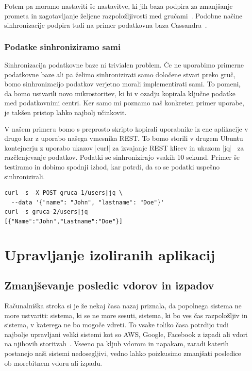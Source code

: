 \documentclass[a4paper, 12pt]{book}
\begin{document}
Potem pa moramo nastaviti še nastavitve, ki jih baza podpira za zmanj\-šan\-je prometa in zagotavljanje željene razpoložljivosti med gručami~\cite{cratedb-zone}.
Podobne načine sinhronizacije podpira tudi na primer podatkovna baza Cassandra~\cite{cassandra-zone}.
\subsection{Podatke sinhroniziramo sami}
Sinhronizacija podatkovne baze ni trivialen problem.
Če ne uporabimo primerne podatkovne baze ali pa želimo sinhronizirati samo določene stvari preko gruč, bomo sinhronizacijo podatkov verjetno morali implementirati sami.
To pomeni, da bomo ustvarili novo mikrostoritev, ki bi v ozadju kopirala ključne podatke med podatkovnimi centri.
Ker samo mi poznamo naš konkreten primer uporabe, je takšen pristop lahko najbolj učinkovit.

V našem primeru bomo s preprosto skripto kopirali uporabnike iz ene aplikacije v drugo kar z uporabo našega vmesnika REST.
To bomo storili v drugem Ubuntu kontejnerju z uporabo ukazov \spverb|curl| za izvajanje REST klicev in ukazom \spverb|jq|~\cite{jq} za razčlenjevanje podatkov.
Podatki se sinhronizirajo vsakih 10 sekund.
Primer še testiramo in dobimo spodnji izhod, kar potrdi, da so se podatki uspešno sinhronizirali.
\begin{verbatim}
curl -s -X POST gruca-1/users|jq \
  --data '{"name": "John", "lastname": "Doe"}'
curl -s gruca-2/users|jq
[{"Name":"John","Lastname":"Doe"}]
\end{verbatim}
\chapter{Upravljanje izoliranih aplikacij}
\section{Zmanjševanje posledic vdorov in izpadov}
Računalniška stroka si je že nekaj časa nazaj priznala, da popolnega sistema ne more ustvariti: sistema, ki se ne more sesuti, sistema, ki bo ves čas razpoložljiv in sistema, v katerega ne bo mogoče vdreti.
To vsake toliko časa potrdijo tudi najbolje upravljani veliki sistemi kot so AWS, Google, Facebook z izpadi ali vdori na njihovih storitvah~\cite{common-outages}. 
Vseeno pa kljub vdorom in napakam, zaradi katerih postanejo naši sistemi nedosegljivi, vedno lahko poizkusimo zmanjšati posledice ob morebitnem vdoru ali izpadu. 
\end{document}
